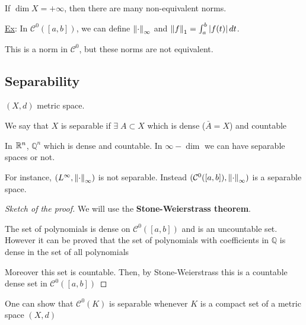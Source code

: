 If \(\dim X = +\infty\), then there are many non-equivalent norms.

\noindent\underline{Ex}: In \(\mathcal{C}^0([a,b])\), we can define \(\norm{\cdot}_{\infty}\) and \(\norm{f}_1 = \int_a^b\abs{f(t)} \, dt\).

This is a norm in \(\mathcal{C}^0\), but these norms are not equivalent. 


\subsection*{Separability}
\((X, d)\) metric space. 
\begin{definition}
    We say that \(X\) is separable if \(\exists \; A \subset X\) which is dense (\(\bar{A} = X\)) and countable 
\end{definition}
In \(\mathbb{R}^n\), \(\mathbb{Q}^n\) which is dense and countable. In \(\infty-\dim\) we can have separable spaces or not. 

For instance, \((L^{\infty}, \norm{\cdot}_{\infty})\) is not separable. Instead \((\mathcal{C}^0([a,b]), \norm{\cdot}_{\infty})\) is a separable space. 

\begin{proof}[Sketch of the proof]
    We will use the \textbf{Stone-Weierstrass theorem}.

    The set of polynomials is dense on \(\mathcal{C}^0([a,b])\) and is an uncountable set. 
    However it can be proved that the set of polynomials with coefficients in \(\mathbb{Q}\) is dense in the set of all polynomials

    Moreover this set is countable. Then, by Stone-Weierstrass this is a countable dense set in \(\mathcal{C}^0([a,b])\)
\end{proof}
\begin{remark}
    One can show that \(\mathcal{C}^0(K)\) is separable whenever \(K\) is a compact set of a metric space \((X,d)\)
\end{remark}


